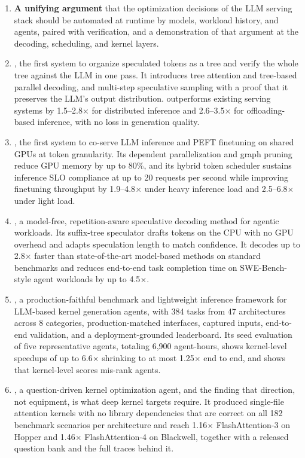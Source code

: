 \begin{enumerate}[leftmargin=*, itemsep=3pt]
\item \textbf{A unifying argument} that the optimization decisions of the LLM serving stack should be automated at runtime by models, workload history, and agents, paired with verification, and a demonstration of that argument at the decoding, scheduling, and kernel layers.

\item \textbf{\SpecInfer}, the first system to organize speculated tokens as a tree and verify the whole tree against the LLM in one pass. It introduces tree attention and tree-based parallel decoding, and multi-step speculative sampling with a proof that it preserves the LLM's output distribution. \SpecInfer outperforms existing serving systems by 1.5--2.8$\times$ for distributed inference and 2.6--3.5$\times$ for offloading-based inference, with no loss in generation quality.

\item \textbf{\FlexLLM}, the first system to co-serve LLM inference and PEFT finetuning on shared GPUs at token granularity. Its dependent parallelization and graph pruning reduce GPU memory by up to 80\%, and its hybrid token scheduler sustains inference SLO compliance at up to 20 requests per second while improving finetuning throughput by 1.9--4.8$\times$ under heavy inference load and 2.5--6.8$\times$ under light load.

\item \textbf{\SuffixDecoding}, a model-free, repetition-aware speculative decoding method for agentic workloads. Its suffix-tree speculator drafts tokens on the CPU with no GPU overhead and adapts speculation length to match confidence. It decodes up to 2.8$\times$ faster than state-of-the-art model-based methods on standard benchmarks and reduces end-to-end task completion time on SWE-Bench-style agent workloads by up to 4.5$\times$.

\item \textbf{\FastKernels}, a production-faithful benchmark and lightweight inference framework for LLM-based kernel generation agents, with 384 tasks from 47 architectures across 8 categories, production-matched interfaces, captured inputs, end-to-end validation, and a deployment-grounded leaderboard. Its seed evaluation of five representative agents, totaling 6{,}900 agent-hours, shows kernel-level speedups of up to 6.6$\times$ shrinking to at most 1.25$\times$ end to end, and shows that kernel-level scores mis-rank agents.

\item \textbf{\KernelSeek}, a question-driven kernel optimization agent, and the finding that direction, not equipment, is what deep kernel targets require. It produced single-file attention kernels with no library dependencies that are correct on all 182 benchmark scenarios per architecture and reach 1.16$\times$ FlashAttention-3 on Hopper and 1.46$\times$ FlashAttention-4 on Blackwell, together with a released question bank and the full traces behind it.
\end{enumerate}

